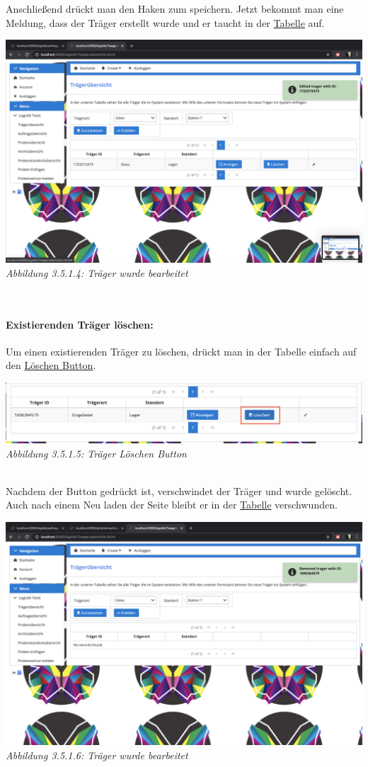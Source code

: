 \documentclass[enabledeprecatedfontcommands,fontsize=12pt,paper=a4,twoside]{scrartcl}
\begin{document}
Anschließend drückt man den Haken zum speichern. 
Jetzt bekommt man eine Meldung, dass der Träger erstellt wurde und er taucht in der \hyperlink{sc3.5.1.4}{Tabelle} auf. 

 \hypertarget{sc3.5.1.4}{
\includegraphics[width=1\textwidth]{Screenshots/3514.png}
\textit{Abbildung 3.5.1.4: Träger wurde bearbeitet}
} \\

\paragraph{Existierenden Träger löschen:}

Um einen existierenden Träger zu löschen, drückt man in der Tabelle einfach auf den \hyperlink{sc3.5.1.5}{Löschen Button}. 

 \hypertarget{sc3.5.1.5}{
\includegraphics[width=1\textwidth]{Screenshots/3515.png}
\textit{Abbildung 3.5.1.5: Träger Löschen Button}
} \\

Nachdem der Button gedrückt ist, verschwindet der Träger und wurde gelöscht. Auch nach einem Neu laden der Seite bleibt er in der \hyperlink{sc3.5.1.6}{Tabelle} verschwunden.

 \hypertarget{sc3.5.1.6}{
\includegraphics[width=1\textwidth]{Screenshots/3516.png}
\textit{Abbildung 3.5.1.6: Träger wurde bearbeitet}
} \\
\end{document}
